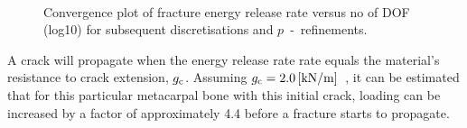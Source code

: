 \documentclass[onecolumn]{svjour3}
\begin{document}
% 	
% 
% 
% 
% 
\begin{figure}[h]
	\centering
	\begin{minipage}{.45\textwidth}
		\def\svgwidth{6.5cm}
		
	\label{fig:bone_ct_mesh_cut}
	\end{minipage}%
	\hspace{0.5cm}
	\begin{minipage}{.45\textwidth}
		\def\svgwidth{6.5cm}
		
		\label{fig:crackfrontforce}
	\end{minipage} \\
	\end{figure}
% 
% 
\begin{figure}[h!]
	\centering
	
	\caption{Convergence plot of fracture energy release rate versus no of DOF (log10) for subsequent discretisations and $p$~-~refinements.}
	\label{fig:max_g1_convergece}
\end{figure}
A crack will propagate when the energy release rate rate equals the material's resistance to crack extension, $g_{\rm c}$. Assuming $g_{\rm c} = 2.0\,[\mathrm{ kN/m}]$~\cite{gasser2007numerical}, it can be estimated that for this particular metacarpal bone with this initial crack, loading can be increased by a factor of approximately 4.4 before a fracture starts to propagate. 
% 
% 
% 
\end{document}
